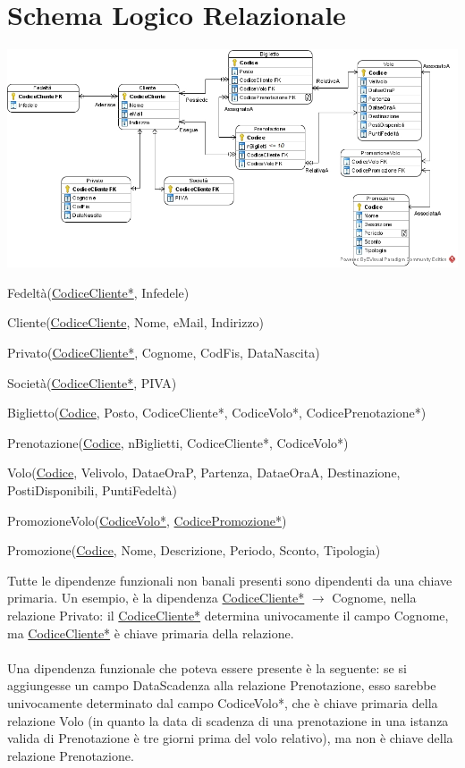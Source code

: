 \documentclass[10pt]{article}
\begin{document}
\section{Schema Logico Relazionale}
\begin{center}
\includegraphics[scale=0.56]{LogicoRelazionale_FlyAway.jpg}
\end{center}
\begin{list}{}{}
	\item Fedeltà(\underline{CodiceCliente*}, Infedele)
	\item Cliente(\underline{CodiceCliente}, Nome, eMail, Indirizzo)
	\item Privato(\underline{CodiceCliente*}, Cognome, CodFis, DataNascita)
	\item Società(\underline{CodiceCliente*}, PIVA)
	\item Biglietto(\underline{Codice}, Posto, CodiceCliente*, CodiceVolo*, CodicePrenotazione*)
	\item Prenotazione(\underline{Codice}, nBiglietti, CodiceCliente*, CodiceVolo*)
	\item Volo(\underline{Codice}, Velivolo, DataeOraP, Partenza, DataeOraA, Destinazione, PostiDisponibili, PuntiFedeltà)
	\item PromozioneVolo(\underline{CodiceVolo*}, \underline{CodicePromozione*})
	\item Promozione(\underline{Codice}, Nome, Descrizione, Periodo, Sconto, Tipologia)
\end{list}
Tutte le dipendenze funzionali non banali presenti sono dipendenti da una chiave primaria. Un esempio, è la dipendenza \underline{CodiceCliente*} $\longrightarrow$ Cognome, nella relazione Privato: il \underline{CodiceCliente*} determina univocamente il campo Cognome, ma \underline{CodiceCliente*} è chiave primaria della relazione.\\\\
Una dipendenza funzionale che poteva essere presente è la seguente: se si aggiungesse un campo DataScadenza alla relazione Prenotazione, esso sarebbe univocamente determinato dal campo CodiceVolo*, che è chiave primaria della relazione Volo (in quanto la data di scadenza di una prenotazione in una istanza valida di Prenotazione è tre giorni prima del volo relativo), ma non è chiave della relazione Prenotazione.
\pagebreak
\end{document}
